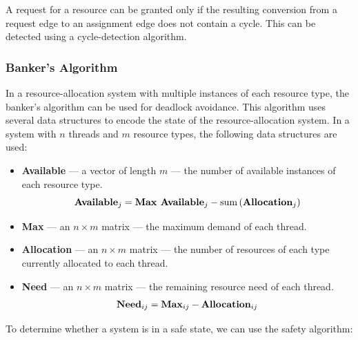 \documentclass{article}
\begin{document}
A request for a resource can be granted only if the resulting
conversion from a request edge to an assignment edge does not contain a
cycle. This can be detected using a cycle-detection algorithm.
\subsubsection{Banker's Algorithm}
In a resource-allocation system with multiple instances of each
resource type, the banker's algorithm can be used for deadlock
avoidance. This algorithm uses several data structures to encode the
state of the resource-allocation system. In a system with \(n\) threads
and \(m\) resource types, the following data structures are used:
\begin{itemize}
    \item \textbf{Available} --- a vector of length \(m\) --- the number of available instances of each resource type.
          \begin{equation*}
              \text{\textbf{Available}}_j = \text{\textbf{Max Available}}_j - \mathrm{sum}\left( \text{\textbf{Allocation}}_j \right)
          \end{equation*}
    \item \textbf{Max} --- an \(n \times m\) matrix --- the maximum
          demand of each thread.
    \item \textbf{Allocation} --- an \(n \times m\) matrix --- the
          number of resources of each type currently allocated to each
          thread.
    \item \textbf{Need} --- an \(n \times m\) matrix --- the remaining
          resource need of each thread.
          \begin{equation*}
              \text{\textbf{Need}}_{ij} = \text{\textbf{Max}}_{ij} - \text{\textbf{Allocation}}_{ij}
          \end{equation*}
\end{itemize}
To determine whether a system is in a safe state, we can use the safety
algorithm:
\end{document}
